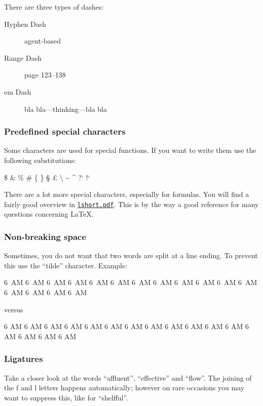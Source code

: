 There are three types of dashes:
\begin{description}
  \item[Hyphen Dash] agent-based
  \item[Range Dash] page 123--138
  \item[em Dash] bla bla---thinking---bla bla
\end{description}

\subsubsection{Predefined special characters}

Some characters are used for special functions. If you want to write
them use the following substitutions:

\$
\&
\%
\#
\{
\}
%
\S{}
\pounds{}
\textbackslash{}
\textasciitilde{}
\textasciicircum{}
%
?`
!`

There are a lot more special characters, especially for formulas.
You will find a fairly good overview in
\href{http://www.ctan.org/tex-archive/info/lshort/english/lshort.pdf}{\texttt{lshort.pdf}}.
This is by the way a good reference for many questions concerning \LaTeX{}.

\subsubsection{Non-breaking space}

Sometimes, you do not want that two words are split at a line ending.
To prevent this use the ``tilde'' character. Example:

6~AM 6~AM 6~AM 6~AM 6~AM 6~AM 6~AM 6~AM 6~AM 6~AM 6~AM 6~AM 6~AM 6~AM
6~AM 6~AM

versus

6 AM 6 AM 6 AM 6 AM 6 AM 6 AM 6 AM 6 AM 6 AM 6 AM 6 AM 6 AM 6 AM 6 AM
6 AM 6 AM

\subsubsection{Ligatures}

Take a closer look at the words ``affluent'', ``effective'' and ``flow''.
The joining of the f and l letters
happens automatically; however on rare occasions
you may want to
suppress this, like for ``shelf{}ful''.
